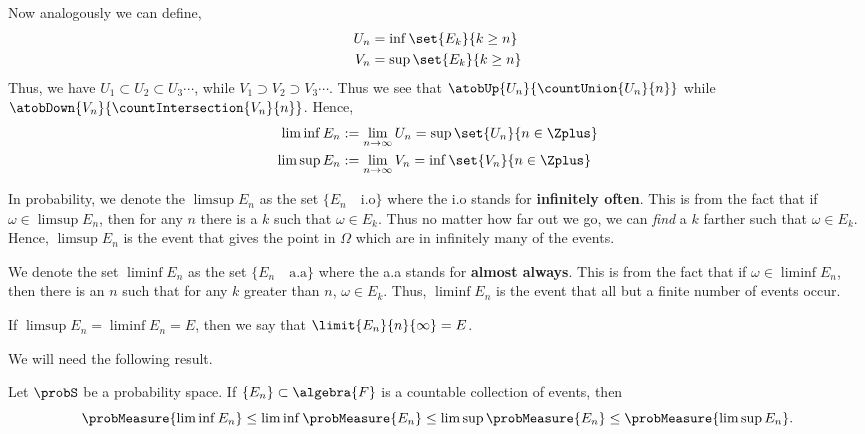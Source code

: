 \begin{Remark}
    Now analogously we can define,
    \begin{align*}
	U_n &= \inf\set{E_k}{k\geq n} \\
	V_n &= \sup\set{E_k}{k\geq n} \\
    \end{align*}
    Thus, we have $U_1 \subset U_2 \subset U_3 \cdots$, while $V_1 \supset V_2 \supset V_3 \cdots$.
    Thus we see that $\atobUp{U_n}{\countUnion{U_n}{n}}$ while 
    $\atobDown{V_n}{\countIntersection{V_n}{n}}$. Hence,
    \begin{align*}
	\liminf E_n & := \lim\limits_{n\to\infty}U_n = \sup\set{U_n}{n\in \Zplus} \\
	\limsup E_n & := \lim\limits_{n\to\infty}V_n = \inf\set{V_n}{n\in \Zplus} \\
    \end{align*}	
    

    In probability, we denote the $\limsup E_n$ as the set $\lbrace E_n \quad \text{i.o}\rbrace$
    where the i.o stands for \textbf{infinitely often}. This is from the fact that if $\omega \in
    \limsup E_n$, then for any $n$ there is a $k$ such that $\omega \in E_k$. Thus no matter how far
    out we go, we can \emph{find} a $k$ farther such that $\omega \in E_k$. Hence, $\limsup E_n$ is
    the event that gives the point in $\Omega$ which are in infinitely many of the events.

    We denote the set $\liminf E_n$ as the set $\lbrace E_n \quad \text{a.a}\rbrace$ where the a.a
    stands for \textbf{almost always}. This is from the fact that if $\omega \in \liminf E_n$, then
    there is an $n$ such that for any $k$ greater than $n$, $\omega \in E_k$. Thus, $\liminf E_n$ is
    the event that all but a finite number of events occur. 

    If $\limsup E_n = \liminf E_n = E$, then we say that $\limit{E_n}{n}{\infty} = E$.
\end{Remark}
We will need the following result.
\begin{Proposition}\label{prop:prob_meas_limsup_liminf}
    Let $\probS$ be a probability space. If $\lbrace E_n \rbrace \subset \algebra{F}$ is a countable
    collection of events, then
    \[\probMeasure{\liminf E_n} \leq \liminf \probMeasure{E_n} \leq \limsup \probMeasure{E_n} \leq
	\probMeasure{\limsup E_n}.\]
\end{Proposition}
